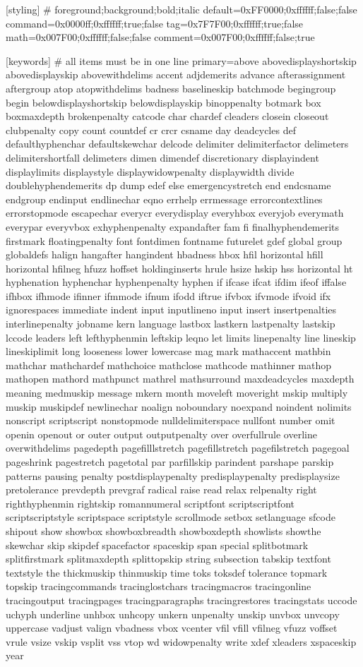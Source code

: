 [styling]
# foreground;background;bold;italic
default=0xFF0000;0xffffff;false;false
command=0x0000ff;0xffffff;true;false
tag=0x7F7F00;0xffffff;true;false
math=0x007F00;0xffffff;false;false
comment=0x007F00;0xffffff;false;true

[keywords]
# all items must be in one line
primary=above abovedisplayshortskip abovedisplayskip abovewithdelims accent adjdemerits advance afterassignment aftergroup atop atopwithdelims badness baselineskip batchmode begingroup begin belowdisplayshortskip belowdisplayskip binoppenalty botmark box boxmaxdepth brokenpenalty catcode char chardef cleaders closein closeout clubpenalty copy count countdef cr crcr csname day deadcycles def defaulthyphenchar defaultskewchar delcode delimiter delimiterfactor delimeters delimitershortfall delimeters dimen dimendef discretionary displayindent displaylimits displaystyle displaywidowpenalty displaywidth divide doublehyphendemerits dp dump edef else emergencystretch end endcsname endgroup endinput endlinechar eqno errhelp errmessage errorcontextlines errorstopmode escapechar everycr everydisplay everyhbox everyjob everymath everypar everyvbox exhyphenpenalty expandafter fam fi finalhyphendemerits firstmark floatingpenalty font fontdimen fontname futurelet gdef global group globaldefs halign hangafter hangindent hbadness hbox hfil horizontal hfill horizontal hfilneg hfuzz hoffset holdinginserts hrule hsize hskip hss horizontal ht hyphenation hyphenchar hyphenpenalty hyphen if ifcase ifcat ifdim ifeof iffalse ifhbox ifhmode ifinner ifmmode ifnum ifodd iftrue ifvbox ifvmode ifvoid ifx ignorespaces immediate indent input inputlineno input insert insertpenalties interlinepenalty jobname kern language lastbox lastkern lastpenalty lastskip lccode leaders left lefthyphenmin leftskip leqno let limits linepenalty line lineskip lineskiplimit long looseness lower lowercase mag mark mathaccent mathbin mathchar mathchardef mathchoice mathclose mathcode mathinner mathop mathopen mathord mathpunct mathrel mathsurround maxdeadcycles maxdepth meaning medmuskip message mkern month moveleft moveright mskip multiply muskip muskipdef newlinechar noalign noboundary noexpand noindent nolimits nonscript scriptscript nonstopmode nulldelimiterspace nullfont number omit openin openout or outer output outputpenalty over overfullrule overline overwithdelims pagedepth pagefilllstretch pagefillstretch pagefilstretch pagegoal pageshrink pagestretch pagetotal par parfillskip parindent parshape parskip patterns pausing penalty postdisplaypenalty predisplaypenalty predisplaysize pretolerance prevdepth prevgraf radical raise read relax relpenalty right righthyphenmin rightskip romannumeral scriptfont scriptscriptfont scriptscriptstyle scriptspace scriptstyle scrollmode setbox setlanguage sfcode shipout show showbox showboxbreadth showboxdepth showlists showthe skewchar skip skipdef spacefactor spaceskip span special splitbotmark splitfirstmark splitmaxdepth splittopskip string subsection tabskip textfont textstyle the thickmuskip thinmuskip time toks toksdef tolerance topmark topskip tracingcommands tracinglostchars tracingmacros tracingonline tracingoutput tracingpages tracingparagraphs tracingrestores tracingstats uccode uchyph underline unhbox unhcopy unkern unpenalty unskip unvbox unvcopy uppercase vadjust valign vbadness vbox vcenter vfil vfill vfilneg vfuzz voffset vrule vsize vskip vsplit vss vtop wd widowpenalty write xdef xleaders xspaceskip year
